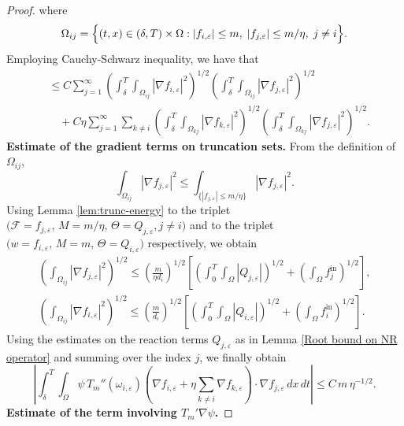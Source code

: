\documentclass[a4paper,12pt,reqno]{amsart}
\theoremstyle{plain}
\numberwithin{equation}{section}
\begin{document}
\begin{proof}
		where
		\[
		\Omega_{ij}
		=
		\Bigl\{
		(t,x)\in(\delta,T)\times\Omega:
		|f_{i,\varepsilon}|\le m,\;
		|f_{j,\varepsilon}|\le m/\eta,\;
		j\ne i
		\Bigr\}.
		\]
		Employing Cauchy-Schwarz inequality, we have that
		\begin{align*}
			&\le
			C\sum_{j=1}^{\infty}
			\left(
			\int_{\delta}^{T}\!\!\int_{\Omega_{ij}}
			|\nabla f_{i,\varepsilon}|^{2}
			\right)^{1/2}
			\left(
			\int_{\delta}^{T}\!\!\int_{\Omega_{ij}}
			|\nabla f_{j,\varepsilon}|^{2}
			\right)^{1/2}
			\\
			&\quad
			+
			C\eta
			\sum_{j=1}^{\infty}\sum_{k\ne i}
			\left(
			\int_{\delta}^{T}\!\!\int_{\Omega_{kj}}
			|\nabla f_{k,\varepsilon}|^{2}
			\right)^{1/2}
			\left(
			\int_{\delta}^{T}\!\!\int_{\Omega_{kj}}
			|\nabla f_{j,\varepsilon}|^{2}
			\right)^{1/2}.
		\end{align*}
		\medskip
		\textbf{Estimate of the gradient terms on truncation sets.}
		From the definition of \(\Omega_{ij}\),
		\[
		\int_{\Omega_{ij}} |\nabla f_{j,\varepsilon}|^{2}
		\le
		\int_{\{|f_{j,\varepsilon}|\le m/\eta\}}
		|\nabla f_{j,\varepsilon}|^{2}.
		\]
		Using Lemma \ref{lem:trunc-energy} to the triplet \( \big(\mathcal{F}=f_{j,\varepsilon}, \, M=m/\eta, \, \Theta=Q_{j,\varepsilon}, j\neq i\big)\) and to the triplet \( \big(w=f_{i,\varepsilon}, \, M=m, \, \Theta=Q_{i,\varepsilon}\big)\) respectively, we obtain
		\begin{align}\label{use_small_initial_mas}
			\left(
			\int_{\Omega_{ij}} |\nabla f_{j,\varepsilon}|^{2}
			\right)^{1/2}
			\le
			\left(\frac{m}{\eta d_i}\right)^{1/2}
			\left[
			\left(
			\int_{0}^{T}\!\!\int_{\Omega}|Q_{j,\varepsilon}|
			\right)^{1/2}
			+
			\left(
			\int_{\Omega} f_j^{\mathrm{in}}
			\right)^{1/2}
			\right],\\
			\left(
			\int_{\Omega_{ij}} |\nabla f_{i,\varepsilon}|^{2}
			\right)^{1/2}
			\le
			\left(\frac{m}{d_i}\right)^{1/2}
			\left[
			\left(
			\int_{0}^{T}\!\!\int_{\Omega}|Q_{i,\varepsilon}|
			\right)^{1/2}
			+
			\left(
			\int_{\Omega} f_i^{\mathrm{in}}
			\right)^{1/2}
			\right].
		\end{align}
		Using the estimates on the reaction terms \(Q_{j,\varepsilon}\) as in Lemma \ref{Root bound on NR operator}  and summing over the index \(j\), we finally obtain
		\[
		\left|
		\int_{\delta}^{T}\!\!\int_{\Omega}
		\psi\,
		T_m''(\omega_{i,\varepsilon})
		(\nabla f_{i,\varepsilon}
		+\eta\sum_{k\ne i}\nabla f_{k,\varepsilon})
		\cdot\nabla f_{j,\varepsilon}
		\,dx\,dt
		\right|
		\le
		C\,m\,\eta^{-1/2}.
		\]
		\textbf{Estimate of the term involving \(T_m'\nabla\psi\).}

\end{proof}
\end{document}
